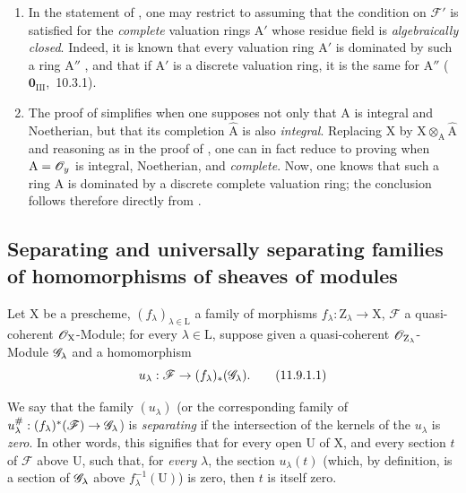\begin{remarks}[11.8.2]
\label{IV.11.8.2}
\medskip\noindent
\begin{enumerate}[label=(\roman*)]
  \item In the statement of , one may restrict to assuming that the condition on $\mathscr{F}'$ is satisfied for the \emph{complete} valuation rings $\mathrm{A}'$ whose residue field is \emph{algebraically closed}.
  Indeed, it is known that every valuation ring $\mathrm{A}'$ is dominated by such a ring $\mathrm{A}''$ , and that if $\mathrm{A}'$ is a discrete valuation ring, it is the same for $\mathrm{A}''$ ($\mathbf{0}_{\mathrm{III}}$,~10.3.1).
  \item The proof of  simplifies when one supposes not only that $\mathrm{A}$ is integral and Noetherian, but that its completion $\hat{\mathrm{A}}$ is also \emph{integral}.
  Replacing $\mathrm{X}$ by $\mathrm{X}\otimes_\mathrm{A}\hat{\mathrm{A}}$ and reasoning as in the proof of , one can in fact reduce to proving  when $\mathrm{A}=\mathscr{O}_y$ is integral, Noetherian, and \emph{complete}.
  Now, one knows  that such a ring $\mathrm{A}$ is dominated by a discrete complete valuation ring; the conclusion follows therefore directly from .
\end{enumerate}
\end{remarks}

\subsection{Separating and universally separating families of homomorphisms of sheaves of modules}
\label{subsection:IV.11.9}

\begin{env}[11.9.1]
\label{IV.11.9.1}
Let $\mathrm{X}$ be a prescheme, $(f_\lambda)_{\lambda\in\mathrm{L}}$ a family of morphisms $f_\lambda:\mathrm{Z}_\lambda\to\mathrm{X}$, $\mathscr{F}$ a quasi-coherent $\mathscr{O}_\mathrm{X}$-Module; for every $\lambda\in\mathrm{L}$, suppose given a quasi-coherent $\mathscr{O}_{\mathrm{Z}_\lambda}$-Module $\mathscr{G}_\lambda$ and a homomorphism
\[
  u_\lambda:\mathscr{F}\to(f_\lambda)_*(\mathscr{G}_\lambda).
\tag{11.9.1.1}\label{IV.11.9.1.1}
\]
\end{env}

We say that the family $(u_\lambda)$ (or the corresponding family of $u_\lambda^{\#}:(f_\lambda)^*(\mathscr{F})\to\mathscr{G}_\lambda$) is \emph{separating} if the intersection of the kernels of the $u_\lambda$ is \emph{zero}.
In other words, this signifies that for every open $\mathrm{U}$ of $\mathrm{X}$, and every section $t$ of $\mathscr{F}$ above $\mathrm{U}$, such that, for \emph{every} $\lambda$, the section $u_\lambda(t)$ (which, by definition, is a section of $\mathscr{G}_\lambda$ above $f_\lambda^{-1}(\mathrm{U})$) is zero, then $t$ is itself zero.

